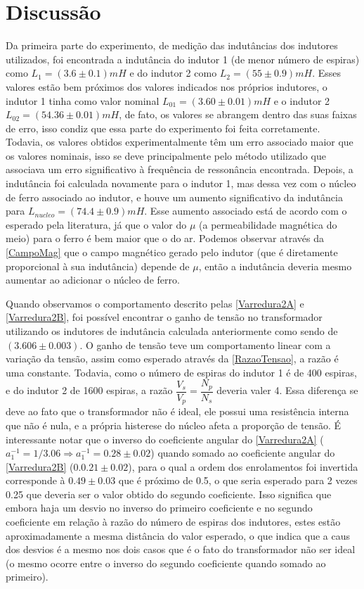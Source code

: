 \documentclass[11pt,a4paper]{article}
\begin{document}
%
\section{Discussão}

    Da primeira parte do experimento, de medição das indutâncias dos indutores utilizados, foi encontrada a indutância do indutor 1 (de menor número de espiras) como $L_1=(3.6 \pm 0.1)mH$ e do indutor 2 como $L_2=(55 \pm 0.9)mH$. Esses valores estão bem próximos dos valores indicados nos próprios indutores, o indutor 1 tinha como valor nominal $L_{01}=(3.60 \pm 0.01)mH$ e o indutor 2 $L_{02}=(54.36 \pm 0.01)mH$, de fato, os valores se abrangem dentro das suas faixas de erro, isso condiz que essa parte do experimento foi feita corretamente. Todavia, os valores obtidos experimentalmente têm um erro associado maior que os valores nominais, isso se deve principalmente pelo método utilizado que associava um erro significativo à frequência de ressonância encontrada.
    Depois, a indutância foi calculada novamente para o indutor 1, mas dessa vez com o núcleo de ferro associado ao indutor, e houve um aumento significativo da indutância para $L_{nucleo}=(74.4 \pm 0.9)mH$. Esse aumento associado está de acordo com o esperado pela literatura, já que o valor do $\mu$ (a permeabilidade magnética do meio) para o ferro é bem maior que o do ar. Podemos observar através da \cref{CampoMag} que o campo magnético gerado pelo indutor (que é diretamente proporcional à sua indutância) depende de $\mu$, então a indutância deveria mesmo aumentar ao adicionar o núcleo de ferro.
    
    Quando observamos o comportamento descrito pelas \cref{Varredura2A} e \cref{Varredura2B}, foi possível encontrar o ganho de tensão no transformador utilizando os indutores de indutância calculada anteriormente como sendo de $(3.606 \pm 0.003)$. O ganho de tensão teve um comportamento linear com a variação da tensão, assim como esperado através da \cref{RazaoTensao}, a razão é uma constante. Todavia, como o número de espiras do indutor 1 é de 400 espiras, e do indutor 2 de 1600 espiras, a razão $\dfrac{V_s}{V_p}=\dfrac{N_p}{N_s}$ deveria valer 4. Essa diferença se deve ao fato que o transformador não é ideal, ele possui uma resistência interna que não é nula, e a própria histerese do núcleo afeta a proporção de tensão. 
    É interessante notar que o inverso do coeficiente angular do \cref{Varredura2A} ($a^{-1}_1=1/3.06 \Rightarrow a^{-1}_1 = 0.28 \pm 0.02$) quando somado ao coeficiente angular do \cref{Varredura2B} ($0.0.21 \pm 0.02$), para o qual a ordem dos enrolamentos foi invertida corresponde à $0.49 \pm 0.03$ que é próximo de 0.5, o que seria esperado para 2 vezes 0.25 que deveria ser o valor obtido do segundo coeficiente. Isso significa que embora haja um desvio no inverso do primeiro coeficiente e no segundo coeficiente em relação à razão do número de espiras dos indutores, estes estão aproximadamente a mesma distância do valor esperado, o que indica que a caus dos desvios é a mesmo nos dois casos que é o fato do transformador não ser ideal (o mesmo ocorre entre o inverso do segundo coeficiente quando somado ao primeiro). 
\end{document}

